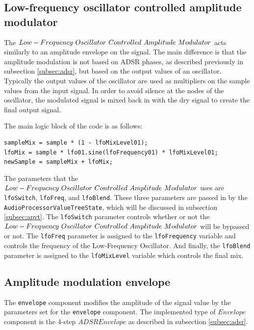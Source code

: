 \documentclass[a4paper,12pt]{report}
\begin{document}
\subsection{Low-frequency oscillator controlled amplitude modulator}
\label{subsec:lfcocontrolampmod}
The $Low-Frequency\ \-Oscillator\ \-Controlled\ \-Amplitude\ \-Modulator$ acts similarly to an amplitude envelope on the signal. The main difference is that the amplitude modulation is not based on ADSR phases, as described previously in subsection \ref{subsec:adsr}, but based on the output values of an oscillator. Typically the output values of the oscillator are used as multipliers on the sample values from the input signal. In order to avoid silence at the nodes of the oscillator, the modulated signal is mixed back in with the dry signal to create the final output signal.

The main logic block of the code is as follows:

 \noindent\begin{minipage}{\linewidth} \begin{lstlisting}[caption={LFO Mix},label={code:mixlevels},captionpos=b]
sampleMix = sample * (1 - lfoMixLevel01);
lfoMix = sample * lfo01.sine(lfoFrequency01) * lfoMixLevel01;
newSample = sampleMix + lfoMix;
\end{lstlisting} \end{minipage}

The parameters that the $Low-Frequency\ \-Oscillator\ \-Controlled\ \-Amplitude\ \-Modulator$ uses are \texttt{lfo\-Switch}, \texttt{lfo\-Freq}, and \texttt{lfo\-Blend}. These three parameters are passed in by the \texttt{Audio\-Processor\-Value\-Tree\-State}, which will be discussed in subsection \ref{subsec:apvt}. The \texttt{lfo\-Switch} parameter controls whether or not the $Low-Frequency\ \-Oscillator\ \-Controlled\ \-Amplitude\ \-Modulator$ will be bypassed or not. The \texttt{lfo\-Freq} parameter is assigned to the \texttt{lfo\-Frequency} variable and controls the frequency of the Low-Frequency Oscillator. And finally, the \texttt{lfo\-Blend} parameter is assigned to the \texttt{lfo\-Mix\-Level} variable which controls the final mix.

\subsection{Amplitude modulation envelope}
\label{subsec:amenv}
The \texttt{envelope} component modifies the amplitude of the signal value by the parameters set for the \texttt{envelope} component. The implemented type of $Envelope$ component is the 4-step $ADSR Envelope$ as described in subsection \ref{subsec:adsr}. 
\end{document}
